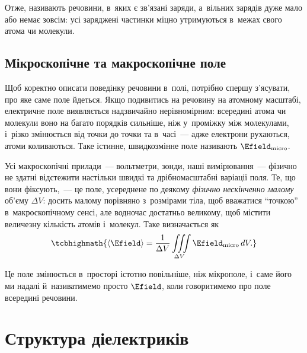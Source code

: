 Отже,  називають речовини, в~яких є зв'язані заряди, а~вільних зарядів
дуже мало або немає зовсім: усі заряджені частинки міцно утримуються в~межах свого атома чи
молекули.


\subsection*{Мікроскопічне та макроскопічне поле}


Щоб коректно описати поведінку речовини в~полі, потрібно спершу з'ясувати, про яке саме
поле йдеться. Якщо подивитись на речовину на атомному масштабі, електричне поле
виявляється надзвичайно нерівномірним: всередині атома чи молекули воно на багато порядків
сильніше, ніж у~проміжку між молекулами, і~різко змінюється від точки до точки та
в~часі~--- адже електрони рухаються, атоми коливаються. Таке істинне, швидкозмінне поле
називають  $\Efield_\text{micro}$.

Усі макроскопічні прилади~--- вольтметри, зонди, наші вимірювання~--- фізично не здатні
відстежити настільки швидкі та дрібномасштабні варіації поля. Те, що вони фіксують,~--- це
поле, усереднене по деякому \emph{фізично нескінченно малому} об'єму $\Delta V$: досить
малому порівняно з~розмірами тіла, щоб вважатися \enquote{точкою} в~макроскопічному сенсі,
але водночас достатньо великому, щоб містити величезну кількість атомів і~молекул. Таке
 визначається як
\begin{equation*}
	\tcbhighmath{
		\left\langle \Efield\right\rangle = \frac1{\Delta V} \iiint\limits_{\Delta V} \Efield_\text{micro}\, dV.
	}
\end{equation*}

Це поле змінюється в~просторі істотно повільніше, ніж мікрополе, і~саме його ми надалі
й~називатимемо просто $\Efield$, коли говоритимемо про поле всередині речовини.


\section{Структура діелектриків}\hypertarget{dielectric-structure}{}


